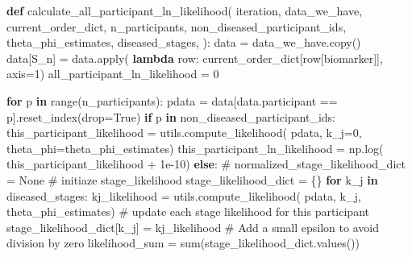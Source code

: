 \documentclass[
  letterpaper,
  DIV=11,
  numbers=noendperiod]{scrreprt}
\newenvironment{Shaded}{\begin{snugshade}}{\end{snugshade}}
\newcommand{\BuiltInTok}[1]{\textcolor[rgb]{0.00,0.23,0.31}{#1}}
\newcommand{\CommentTok}[1]{\textcolor[rgb]{0.37,0.37,0.37}{#1}}
\newcommand{\ControlFlowTok}[1]{\textcolor[rgb]{0.00,0.23,0.31}{\textbf{#1}}}
\newcommand{\DecValTok}[1]{\textcolor[rgb]{0.68,0.00,0.00}{#1}}
\newcommand{\FloatTok}[1]{\textcolor[rgb]{0.68,0.00,0.00}{#1}}
\newcommand{\KeywordTok}[1]{\textcolor[rgb]{0.00,0.23,0.31}{\textbf{#1}}}
\newcommand{\NormalTok}[1]{\textcolor[rgb]{0.00,0.23,0.31}{#1}}
\newcommand{\OperatorTok}[1]{\textcolor[rgb]{0.37,0.37,0.37}{#1}}
\newcommand{\StringTok}[1]{\textcolor[rgb]{0.13,0.47,0.30}{#1}}
\newcommand{\VariableTok}[1]{\textcolor[rgb]{0.07,0.07,0.07}{#1}}
\begin{document}
\begin{Shaded}
\begin{Highlighting}[]
\KeywordTok{def}\NormalTok{ calculate\_all\_participant\_ln\_likelihood(}
\NormalTok{        iteration,}
\NormalTok{        data\_we\_have,}
\NormalTok{        current\_order\_dict,}
\NormalTok{        n\_participants,}
\NormalTok{        non\_diseased\_participant\_ids,}
\NormalTok{        theta\_phi\_estimates,}
\NormalTok{        diseased\_stages,}
\NormalTok{):}
\NormalTok{    data }\OperatorTok{=}\NormalTok{ data\_we\_have.copy()}
\NormalTok{    data[}\StringTok{\textquotesingle{}S\_n\textquotesingle{}}\NormalTok{] }\OperatorTok{=}\NormalTok{ data.}\BuiltInTok{apply}\NormalTok{(}
        \KeywordTok{lambda}\NormalTok{ row: current\_order\_dict[row[}\StringTok{\textquotesingle{}biomarker\textquotesingle{}}\NormalTok{]], axis}\OperatorTok{=}\DecValTok{1}\NormalTok{)}
\NormalTok{    all\_participant\_ln\_likelihood }\OperatorTok{=} \DecValTok{0}

    \ControlFlowTok{for}\NormalTok{ p }\KeywordTok{in} \BuiltInTok{range}\NormalTok{(n\_participants):}
\NormalTok{        pdata }\OperatorTok{=}\NormalTok{ data[data.participant }\OperatorTok{==}\NormalTok{ p].reset\_index(drop}\OperatorTok{=}\VariableTok{True}\NormalTok{)}
        \ControlFlowTok{if}\NormalTok{ p }\KeywordTok{in}\NormalTok{ non\_diseased\_participant\_ids:}
\NormalTok{            this\_participant\_likelihood }\OperatorTok{=}\NormalTok{ utils.compute\_likelihood(}
\NormalTok{                pdata, k\_j}\OperatorTok{=}\DecValTok{0}\NormalTok{, theta\_phi}\OperatorTok{=}\NormalTok{theta\_phi\_estimates)}
\NormalTok{            this\_participant\_ln\_likelihood }\OperatorTok{=}\NormalTok{ np.log(}
\NormalTok{                this\_participant\_likelihood }\OperatorTok{+} \FloatTok{1e{-}10}\NormalTok{)}
        \ControlFlowTok{else}\NormalTok{:}
            \CommentTok{\# normalized\_stage\_likelihood\_dict = None}
            \CommentTok{\# initiaze stage\_likelihood}
\NormalTok{            stage\_likelihood\_dict }\OperatorTok{=}\NormalTok{ \{\}}
            \ControlFlowTok{for}\NormalTok{ k\_j }\KeywordTok{in}\NormalTok{ diseased\_stages:}
\NormalTok{                kj\_likelihood }\OperatorTok{=}\NormalTok{ utils.compute\_likelihood(}
\NormalTok{                    pdata, k\_j, theta\_phi\_estimates)}
                \CommentTok{\# update each stage likelihood for this participant}
\NormalTok{                stage\_likelihood\_dict[k\_j] }\OperatorTok{=}\NormalTok{ kj\_likelihood}
            \CommentTok{\# Add a small epsilon to avoid division by zero}
\NormalTok{            likelihood\_sum }\OperatorTok{=} \BuiltInTok{sum}\NormalTok{(stage\_likelihood\_dict.values())}


\end{Highlighting}
\end{Shaded}
\end{document}
